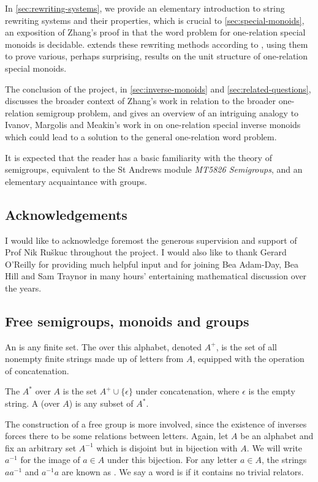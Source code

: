 \documentclass[noindex,noinsetproof,emphthm,12pt]{lmaths}
\begin{document}
In \cref{sec:rewriting-systems}, we provide an elementary introduction to string rewriting systems and their properties, which is crucial to \cref{sec:special-monoids}, an exposition of Zhang's proof in \cite{Zhang1992a} that the word problem for one-relation special monoids is decidable.  extends these rewriting methods according to \cite{Zhang1992}, using them to prove various, perhaps surprising, results on the unit structure of one-relation special monoids.

The conclusion of the project, in  \ref{sec:inverse-monoids} and \ref{sec:related-questions}, discusses the broader context of Zhang's work in relation to the broader one-relation semigroup problem, and gives an overview of an intriguing analogy to Ivanov, Margolis and Meakin's work in \cite{Ivanov2001} on one-relation special inverse monoids which could lead to a solution to the general one-relation word problem.

It is expected that the reader has a basic familiarity with the theory of semigroups, equivalent to the St Andrews module \emph{MT5826 Semigroups}, and an elementary acquaintance with groups.

\subsection*{Acknowledgements}
I would like to acknowledge foremost the generous supervision and support of Prof Nik Ruškuc throughout the project. I would also like to thank Gerard O'Reilly for providing much helpful input and for joining Bea Adam-Day, Bea Hill and Sam Traynor in many hours' entertaining mathematical discussion over the years.

\subsection{Free semigroups, monoids and groups}

An  is any finite set. The  over this alphabet, denoted $A^{+}$, is the set of all nonempty finite strings made up of letters from $A$, equipped with the operation of concatenation.

The  $A^*$ over $A$ is the set $A^+ \cup \{\epsilon\}$ under concatenation, where $\epsilon$ is the empty string. A  (over $A$) is any subset of $A^*$.

The construction of a free group is more involved, since the existence of inverses forces there to be some relations between letters. Again, let $A$ be an alphabet and fix an arbitrary set $A^{-1}$ which is disjoint but in bijection with $A$. We will write $a^{-1}$ for the image of $a \in A$ under this bijection. For any letter $a \in A$, the strings $aa^{-1}$ and $a^{-1}a$ are known as . We say a word is  if it contains no trivial relators.
\end{document}
